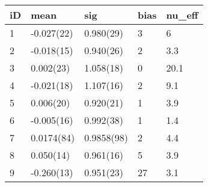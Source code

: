 
\begin{tabular}{l|l|l|l|l}
\hline
iD & mean & sig & bias & nu\_eff\\
\hline
1 & -0.027(22) & 0.980(29) & 3 & 6\\
\hline
2 & -0.018(15) & 0.940(26) & 2 & 3.3\\
\hline
3 & 0.002(23) & 1.058(18) & 0 & 20.1\\
\hline
4 & -0.021(18) & 1.107(16) & 2 & 9.1\\
\hline
5 & 0.006(20) & 0.920(21) & 1 & 3.9\\
\hline
6 & -0.005(16) & 0.992(38) & 1 & 1.4\\
\hline
7 & 0.0174(84) & 0.9858(98) & 2 & 4.4\\
\hline
8 & 0.050(14) & 0.961(16) & 5 & 3.9\\
\hline
9 & -0.260(13) & 0.951(23) & 27 & 3.1\\
\hline
\end{tabular}
